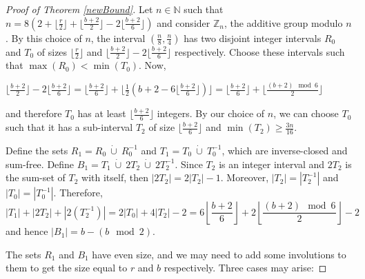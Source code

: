 \documentclass[a4paper,12pt]{article}
\begin{document}
\begin{proof}[Proof of Theorem \ref{newBound}]
	Let $n \in \mathbb{N}$ such that $n = 8\left(2 + \big\lfloor\frac{r}{2}\big\rfloor + \big\lfloor\frac{b+2}{2}\big\rfloor - 2\big\lfloor\frac{b+2}{6}\big\rfloor\right)$ and consider $\mathbb{Z}_n$, the additive group modulo $n$. By this choice of $n$, the interval $\left(\frac{n}{8}, \frac{n}{4}\right)$ has two disjoint integer intervals $R_0$ and $T_0$ of sizes $\big\lfloor\frac{r}{2}\big\rfloor$ and $\big\lfloor\frac{b+2}{2}\big\rfloor - 2\big\lfloor\frac{b+2}{6}\big\rfloor$ respectively. Choose these intervals such that $\max(R_0) < \min(T_0)$. Now, 
	
	\begin{center}
		$\big\lfloor\frac{b+2}{2}\big\rfloor - 2\big\lfloor\frac{b+2}{6}\big\rfloor = \big\lfloor\frac{b+2}{6}\big\rfloor + \big\lfloor \frac{1}{2}\left(b+2 - 6\big\lfloor\frac{b+2}{6}\big\rfloor\right)\big\rfloor = \big\lfloor\frac{b+2}{6}\big\rfloor + \big\lfloor \frac{(b+2) \!\mod 6}{2}\big\rfloor$ 
	\end{center} and therefore $T_0$ has at least $\big\lfloor\frac{b+2}{6}\big\rfloor$ integers. By our choice of $n$, we can choose $T_0$ such that it has a sub-interval $T_2$ of size $\big\lfloor\frac{b+2}{6}\big\rfloor$ and $\min(T_2) \geq \frac{3n}{16}$.
	
	Define the sets $R_1 = R_0 \ \dot\cup \ R_0^{-1}$ and $T_1 = T_0 \ \dot\cup \ T_0^{-1}$, which are inverse-closed and sum-free. Define $B_1 = T_1 \ \dot\cup \ 2T_2 \ \dot\cup \ 2T_2^{-1}$. Since $T_2$ is an integer interval and $2T_2$ is the sum-set of $T_2$ with itself, then $|2T_2| = 2|T_2| - 1$. Moreover, $|T_2| = |T_2^{-1}|$ and $|T_0| = |T_0^{-1}|$. Therefore, $$|T_1| + |2T_2| + \left|2\left(T_2^{-1}\right)\right| = 2|T_0| + 4|T_2| - 2 = 6\left \lfloor\frac{b+2}{6}\right \rfloor + 2\left \lfloor \frac{(b+2) \!\mod 6}{2}\right \rfloor - 2$$ and hence $|B_1| = b - \left(b \mod 2\right)$.
	
	The sets $R_1$ and $B_1$ have even size, and we may need to add some involutions to them to get the size equal to $r$ and $b$ respectively. Three cases may arise:
	

\end{proof}
\end{document}
